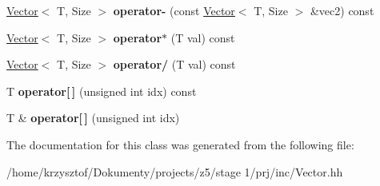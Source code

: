 \begin{DoxyCompactItemize}
\hyperlink{class_vector}{Vector}$<$ T, Size $>$ {\bfseries operator-\/} (const \hyperlink{class_vector}{Vector}$<$ T, Size $>$ \&vec2) const
\item 
\mbox{\label{class_vector_a8aac7b2857598c45e7260cda62a33525}} 
\hyperlink{class_vector}{Vector}$<$ T, Size $>$ {\bfseries operator$\ast$} (T val) const
\item 
\mbox{\label{class_vector_a9654abe7fc4844f24b7c9d9b2ca6b0a9}} 
\hyperlink{class_vector}{Vector}$<$ T, Size $>$ {\bfseries operator/} (T val) const
\item 
\mbox{\label{class_vector_a0326e9f16d4acedc530e09ec34da513c}} 
T {\bfseries operator\mbox{[}$\,$\mbox{]}} (unsigned int idx) const
\item 
\mbox{\label{class_vector_a3c679dc440412d791ae3aec11d327304}} 
T \& {\bfseries operator\mbox{[}$\,$\mbox{]}} (unsigned int idx)
\end{DoxyCompactItemize}


The documentation for this class was generated from the following file\+:\begin{DoxyCompactItemize}
\item 
/home/krzysztof/\+Dokumenty/projects/z5/stage 1/prj/inc/Vector.\+hh\end{DoxyCompactItemize}
